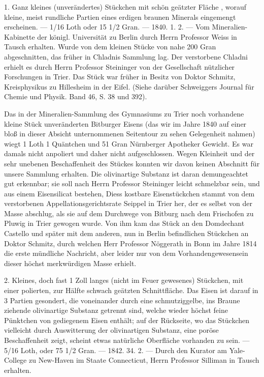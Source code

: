 \documentclass[a4paper, 11pt, oneside, polutonikogreek, german]{article}
\begin{document}
1. Ganz kleines (unverändertes) Stückchen mit schön geätzter Fläche , worauf kleine, meist rundliche Partien eines erdigen braunen Minerals eingemengt erscheinen. — 1/16 Loth oder 15 1/2 Gran. — 1840. 1. 2. — Vom Mineralien-Kabinette der königl. Universität zu Berlin durch Herrn Professor Weiss in Tausch erhalten. Wurde von dem kleinen Stücke von nahe 200 Gran abgeschnitten, das früher in Chladnis Sammlung lag. Der verstorbene Chladni erhielt es durch Herrn Professor Steininger von der Gesellschaft nützlicher Forschungen in Trier. Das Stück war früher in Besitz von Doktor Schmitz, Kreisphysikus zu Hillesheim in der Eifel. (Siehe darüber Schweiggers Journal für Chemie und Physik. Band 46, S. 38 und 392).

Das in der Mineralien-Sammlung des Gymnasiums zu Trier noch vorhandene kleine Stück unveränderten Bitburger Eisens (das wir im Jahre 1840 auf einer bloß in dieser Absicht unternommenen Seitentour zu sehen Gelegenheit nahmen) wiegt 1 Loth 1 Quäntchen und 51 Gran Nürnberger Apotheker Gewicht. Es war damals nicht anpoliert und daher nicht aufgeschlossen. Wegen Kleinheit und der sehr unebenen Beschaffenheit des Stückes konnten wir davon keinen Abschnitt für unsere Sammlung erhalten. Die olivinartige Substanz ist daran demungeachtet gut erkennbar; sie soll nach Herrn Professor Steininger leicht schmelzbar sein, und aus einem Eisensilicat bestehen, Diess kostbare Eisenstückchen stammt von dem verstorbenen Appellationsgerichtsrate Seippel in Trier her, der es selbst von der Masse abschlug, als sie auf dem Durchwege von Bitburg nach dem Frischofen zu Pluwig in Trier gewogen wurde. Von ihm kam das Stück an den Domdechant Castello und später mit dem anderen, nun in Berlin befindlichen Stückchen an Doktor Schmitz, durch welchen Herr Professor Nöggerath in Bonn im Jahre 1814 die erste mündliche Nachricht, aber leider nur von dem Vorhandengewesensein dieser höchst merkwürdigen Masse erhielt.

2. Kleines, doch fast 1 Zoll langes (nicht im Feuer gewesenes) Stückchen, mit einer polierten, zur Hälfte schwach geätzten Schnittfläche. Das Eisen ist darauf in 3 Partien gesondert, die voneinander durch eine schmutziggelbe, ins Braune ziehende olivinartige Substanz getrennt sind, welche wieder höchst feine Pünktchen von gediegenem Eisen enthält; auf der Rückseite, wo das Stückchen vielleicht durch Auswitterung der olivinartigen Substanz, eine poröse Beschaffenheit zeigt, scheint etwas natürliche Oberfläche vorhanden zu sein. — 5/16 Loth, oder 75 1/2 Gran. — 1842. 34. 2. — Durch den Kurator am Yale-College zu New-Haven im Staate Connecticut, Herrn Professor Silliman in Tausch erhalten.
\end{document}
